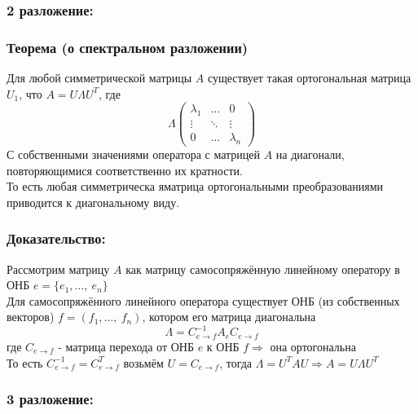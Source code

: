 \documentclass[12pt, letterpaper, twoside]{article}
\begin{document}
    \subsubsection*{2 разложение:}
    \subsubsection*{Теорема (о спектральном разложении)}
    Для любой симметрической матрицы $A$ существует такая ортогональная матрица $U_1$, что $A = U\Lambda U^T$, где 
    \[\Lambda  \begin{pmatrix}
        \lambda_1 &\dots & 0\\
        \vdots& \ddots & \vdots\\
        0 & \dots& \lambda_n
    \end{pmatrix}\]
    С собственными значениями оператора с матрицей $A$ на диагонали, повторяющимися соответственно их кратности.\\
    То есть любая симметрическа яматрица ортогональными преобразованиями приводится к диагональному виду.

    \subsubsection*{Доказательство:}
    Рассмотрим матрицу $A$ как матрицу самосопряжённую линейному оператору в ОНБ $e = \{e_1,\dots,\ e_n\}$\\
    Для самосопряжённого линейного оператора существует ОНБ (из собственных векторов) $f = (f_1,\dots,\ f_n)$,  котором его матрица диагональна
    \[\Lambda = C_{e\to f}^{-1} A_e C_{e\to f}\]
    где $C_{e\to f}$ - матрица перехода от ОНБ $e$ к ОНБ $f\Rightarrow$ она ортогональна\\
    То есть $C_{e\to f}^{-1} = C^T_{e\to f}$ возьмём $U = C_{e\to f}$, тогда $\Lambda = U^T A U\Rightarrow A = U\Lambda U^T$
    
    \subsubsection*{3 разложение:}
\end{document}

